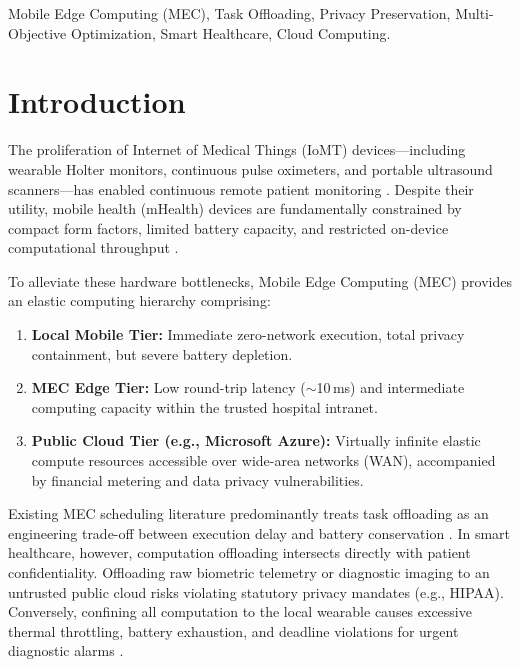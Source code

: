 \documentclass[conference]{IEEEtran}
\begin{document}
\begin{IEEEkeywords}
Mobile Edge Computing (MEC), Task Offloading, Privacy Preservation, Multi-Objective Optimization, Smart Healthcare, Cloud Computing.
\end{IEEEkeywords}

\section{Introduction}
The proliferation of Internet of Medical Things (IoMT) devices—including wearable Holter monitors, continuous pulse oximeters, and portable ultrasound scanners—has enabled continuous remote patient monitoring \cite{mao2017survey}. Despite their utility, mobile health (mHealth) devices are fundamentally constrained by compact form factors, limited battery capacity, and restricted on-device computational throughput \cite{mach2017mobile}.

To alleviate these hardware bottlenecks, Mobile Edge Computing (MEC) provides an elastic computing hierarchy comprising:
\begin{enumerate}
    \item \textbf{Local Mobile Tier:} Immediate zero-network execution, total privacy containment, but severe battery depletion.
    \item \textbf{MEC Edge Tier:} Low round-trip latency ($\sim$10\,ms) and intermediate computing capacity within the trusted hospital intranet.
    \item \textbf{Public Cloud Tier (e.g., Microsoft Azure):} Virtually infinite elastic compute resources accessible over wide-area networks (WAN), accompanied by financial metering and data privacy vulnerabilities.
\end{enumerate}

Existing MEC scheduling literature predominantly treats task offloading as an engineering trade-off between execution delay and battery conservation \cite{chen2016efficient, wang2017computation}. In smart healthcare, however, computation offloading intersects directly with patient confidentiality. Offloading raw biometric telemetry or diagnostic imaging to an untrusted public cloud risks violating statutory privacy mandates (e.g., HIPAA). Conversely, confining all computation to the local wearable causes excessive thermal throttling, battery exhaustion, and deadline violations for urgent diagnostic alarms \cite{lin2019computation}.
\end{document}
